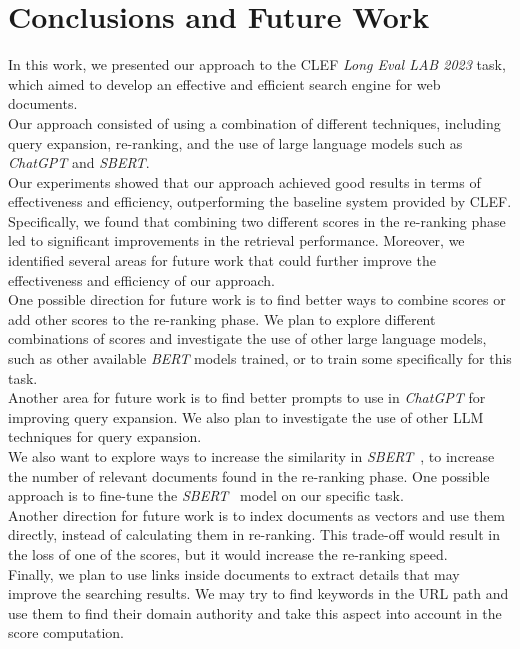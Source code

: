 \newpage
\section{Conclusions and Future Work}
\label{sec:conclusion}
 
In this work, we presented our approach to the \ac{CLEF} \textit{Long Eval LAB 2023} task, which aimed to develop an effective and efficient search engine for web documents. \\
Our approach consisted of using a combination of different techniques, including query expansion, re-ranking, and the use of large language models such as \textit{ChatGPT} and \textit{SBERT}. \\
Our experiments showed that our approach achieved good results in terms of effectiveness and efficiency, outperforming the baseline system provided by \ac{CLEF}. Specifically, we found that combining two different scores in the re-ranking phase led to significant improvements in the retrieval performance. Moreover, we identified several areas for future work that could further improve the effectiveness and efficiency of our approach. \\
One possible direction for future work is to find better ways to combine scores or add other scores to the re-ranking phase. We plan to explore different combinations of scores and investigate the use of other large language models, such as other available \textit{BERT} models trained, or to train some specifically for this task. \\
Another area for future work is to find better prompts \cite{wang2023chatgpt} to use in \textit{ChatGPT} for improving query expansion. We also plan to investigate the use of other \ac{LLM} techniques for query expansion. \\
We also want to explore ways to increase the similarity in \textit{SBERT}~\cite{reimers-2019-sentence-bert}, to increase the number of relevant documents found in the re-ranking phase. One possible approach is to fine-tune the \textit{SBERT}~\cite{reimers-2019-sentence-bert} model on our specific task. \\
Another direction for future work is to index documents as vectors and use them directly, instead of calculating them in re-ranking. This trade-off would result in the loss of one of the scores, but it would increase the re-ranking speed. \\
Finally, we plan to use links inside documents to extract details that may improve the searching results. We may try to find keywords in the URL path and use them to find their domain authority and take this aspect into account in the score computation.
